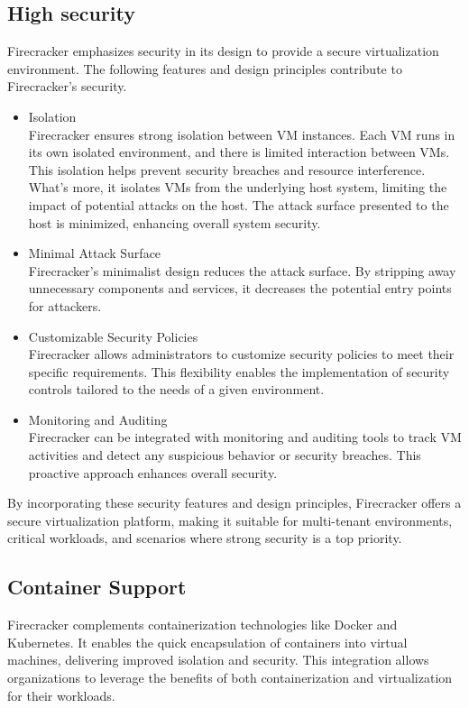 \documentclass[conference]{IEEEtran}
\begin{document}
\subsection{High security}
Firecracker emphasizes security in its design to provide a secure virtualization environment. The following features and design principles contribute to Firecracker's security.
\begin{itemize}
	\item Isolation\\
		Firecracker ensures strong isolation between VM instances. Each VM runs in its own isolated environment, and there is limited interaction between VMs. This isolation helps prevent security breaches and resource interference. What's more, it isolates VMs from the underlying host system, limiting the impact of potential attacks on the host. The attack surface presented to the host is minimized, enhancing overall system security.
	\item Minimal Attack Surface\\
		Firecracker's minimalist design reduces the attack surface. By stripping away unnecessary components and services, it decreases the potential entry points for attackers.
	\item Customizable Security Policies\\
		Firecracker allows administrators to customize security policies to meet their specific requirements. This flexibility enables the implementation of security controls tailored to the needs of a given environment.
	\item Monitoring and Auditing\\
		Firecracker can be integrated with monitoring and auditing tools to track VM activities and detect any suspicious behavior or security breaches. This proactive approach enhances overall security.
\end{itemize}
By incorporating these security features and design principles, Firecracker offers a secure virtualization platform, making it suitable for multi-tenant environments, critical workloads, and scenarios where strong security is a top priority.

\subsection{Container Support}
Firecracker complements containerization technologies like Docker and Kubernetes. It enables the quick encapsulation of containers into virtual machines, delivering improved isolation and security. This integration allows organizations to leverage the benefits of both containerization and virtualization for their workloads.
\end{document}
